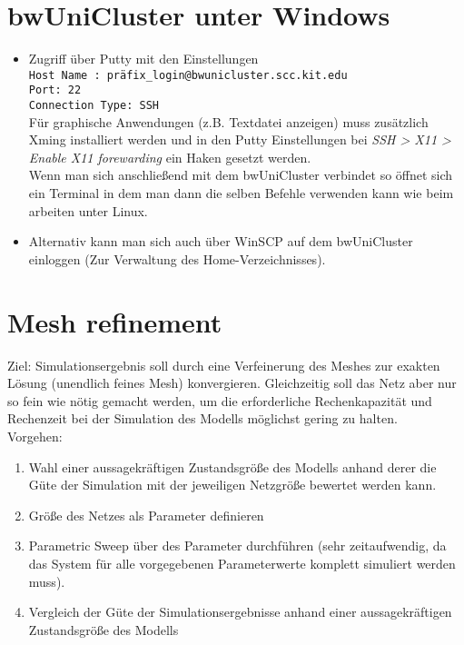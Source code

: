 \documentclass[12pt]{scrartcl}%
\theoremstyle{nonumberplain}
\begin{document}
\section{bwUniCluster unter Windows}
\begin{itemize}
\item Zugriff über Putty mit den Einstellungen\\
\hspace*{0.5cm}\texttt{Host Name : präfix\_login@bwunicluster.scc.kit.edu}\\
\hspace*{0.5cm}\texttt{Port: 22}\\ 
\hspace*{0.5cm}\texttt{Connection Type: SSH} \\ 
Für graphische Anwendungen (z.B. Textdatei anzeigen) muss zusätzlich Xming installiert werden und in den Putty Einstellungen bei \textit{SSH > X11 > Enable X11 forewarding} ein Haken gesetzt werden.\\
Wenn man sich anschließend mit dem bwUniCluster verbindet so öffnet sich ein Terminal in dem man dann die selben Befehle verwenden kann wie beim arbeiten unter Linux.
\item Alternativ kann man sich auch über WinSCP auf dem bwUniCluster einloggen (Zur Verwaltung des Home-Verzeichnisses).
\end{itemize}

\section{Mesh refinement}
Ziel: Simulationsergebnis soll durch eine Verfeinerung des Meshes zur exakten Lösung (unendlich feines Mesh) konvergieren. Gleichzeitig soll das Netz aber nur so fein wie nötig gemacht werden, um die erforderliche Rechenkapazität und Rechenzeit bei der Simulation des Modells möglichst gering zu halten. \\
Vorgehen:
\begin{enumerate}
\item Wahl einer aussagekräftigen Zustandsgröße des Modells anhand derer die Güte der Simulation mit der jeweiligen Netzgröße bewertet werden kann.
\item Größe des Netzes als Parameter definieren
\item Parametric Sweep über des Parameter durchführen (sehr zeitaufwendig, da das System für alle vorgegebenen Parameterwerte komplett simuliert werden muss).
\item Vergleich der Güte der Simulationsergebnisse anhand einer aussagekräftigen Zustandsgröße
des Modells 
\end{enumerate} 
\end{document}
